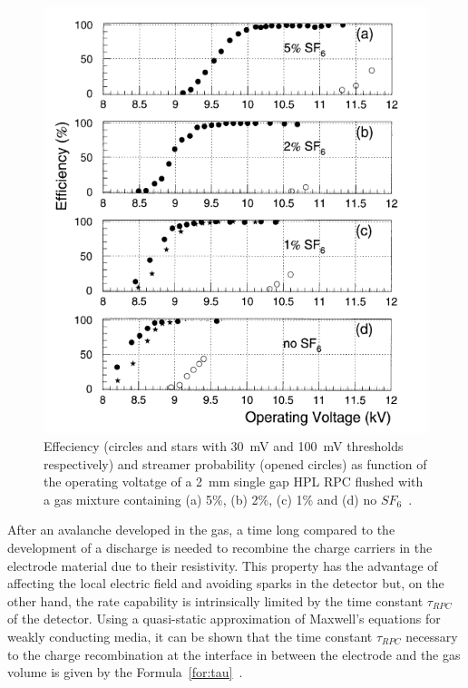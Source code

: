 	\begin{figure}[H]
		\centering
		\includegraphics[width = 0.7\plotwidth]{fig/chapt3/SF6.png}
		\caption{\label{fig:SF6} Effeciency (circles and stars with \SI{30}{mV} and \SI{100}{mV} thresholds respectively) and streamer probability (opened circles) as function of the operating voltatge of a \SI{2}{mm} single gap HPL RPC flushed with a gas mixture containing (a) 5\%, (b) 2\%, (c) 1\% and (d) no $SF_6$~\cite{CAMARRI98}.}
	\end{figure}
	
	After an avalanche developed in the gas, a time long compared to the development of a discharge is needed to recombine the charge carriers in the electrode material due to their resistivity. This property has the advantage of affecting the local electric field and avoiding sparks in the detector but, on the other hand, the rate capability is intrinsically limited by the time constant $\tau_{RPC}$ of the detector. Using a quasi-static approximation of Maxwell’s equations for weakly conducting media, it can be shown that the time constant $\tau_{RPC}$ necessary to the charge recombination at the interface in between the electrode and the gas volume is given by the Formula~\ref{for:tau}~\cite{RIEGLER2002}.
	
